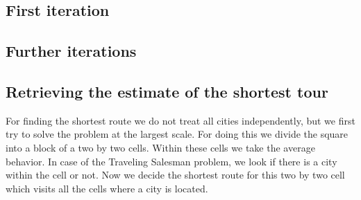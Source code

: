 \subsection{First iteration}
\subsection{Further iterations}
\subsection{Retrieving the estimate of the shortest tour}


For finding the shortest route we do not treat all cities independently, but
we first try to solve the problem at the largest scale. For doing this we
divide the square into a block of a two by two cells. Within these cells we
take the average behavior. In case of the Traveling Salesman problem, we look
if there is a city within the cell or not. Now we decide the shortest route
for this two by two cell which visits all the cells where a city is located.

